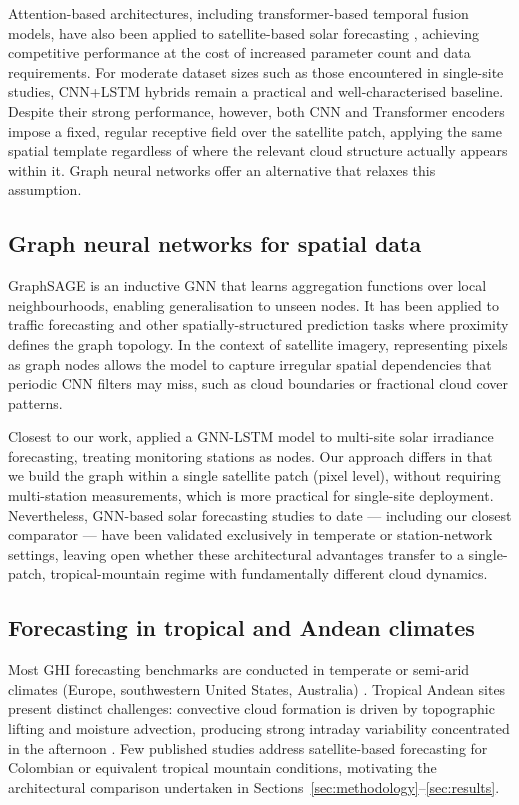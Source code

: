 Attention-based architectures, including transformer-based temporal fusion
models, have also been applied to satellite-based solar forecasting
\cite{liu2023}, achieving competitive performance at the cost of increased
parameter count and data requirements. For moderate dataset sizes such
as those encountered in single-site studies, CNN+LSTM hybrids remain a practical
and well-characterised baseline. Despite their strong performance, however, both
CNN and Transformer encoders impose a fixed, regular receptive field over the
satellite patch, applying the same spatial template regardless of where the
relevant cloud structure actually appears within it. Graph neural networks
offer an alternative that relaxes this assumption.

\subsection{Graph neural networks for spatial data}

GraphSAGE \cite{hamilton2017} is an inductive GNN that learns aggregation
functions over local neighbourhoods, enabling generalisation to unseen nodes.
It has been applied to traffic forecasting \cite{li2018} and other
spatially-structured prediction tasks where proximity defines the graph
topology. In the context of satellite imagery, representing pixels as graph
nodes allows the model to capture irregular spatial dependencies that periodic
CNN filters may miss, such as cloud boundaries or fractional cloud cover patterns.

Closest to our work, \citet{ji2022} applied a GNN-LSTM model to multi-site solar
irradiance forecasting, treating monitoring stations as nodes. Our approach differs
in that we build the graph within a single satellite patch (pixel level), without
requiring multi-station measurements, which is more practical for single-site
deployment. Nevertheless, GNN-based solar forecasting studies to date --- including
our closest comparator --- have been validated exclusively in temperate or
station-network settings, leaving open whether these architectural advantages
transfer to a single-patch, tropical-mountain regime with fundamentally
different cloud dynamics.

\subsection{Forecasting in tropical and Andean climates}

Most GHI forecasting benchmarks are conducted in temperate or semi-arid climates
(Europe, southwestern United States, Australia) \cite{paletta2022,yang2018}.
Tropical Andean sites present distinct challenges: convective cloud formation is
driven by topographic lifting and moisture advection, producing strong intraday
variability concentrated in the afternoon \cite{poveda2014}. Few published studies
address satellite-based forecasting for Colombian or equivalent tropical mountain
conditions, motivating the architectural comparison undertaken in
Sections~\ref{sec:methodology}--\ref{sec:results}.

